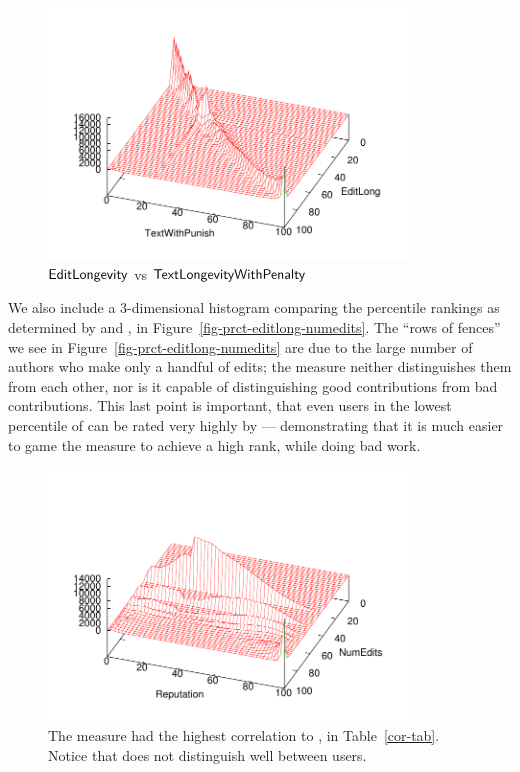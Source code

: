 \begin{figure}[t]
    \begin{center}
    \includegraphics[width=0.85\textwidth]{part-I10-contrib/graphs/prct-editlong-textwithpunish}
    \end{center}
    \caption[$\editlong$ vs $\punish$]{
    	$\editlong$ vs $\punish$
    }
    \label{fig-prct-editlong-textwithpunish}
\end{figure}
%

We also include a 3-dimensional histogram comparing the
percentile rankings as determined by \editlong and \numedits,
in Figure~\ref{fig-prct-editlong-numedits}.
The ``rows of fences'' we see
in Figure~\ref{fig-prct-editlong-numedits}
are due to the large number of authors who
make only a handful of edits; the \numedits measure
neither distinguishes them from each other,
nor is it capable of distinguishing good contributions from 
bad contributions.
This last point is important, that even users in
the lowest percentile of \editlong can be rated
very highly by \numedits --- demonstrating
that it is much easier to game the \numedits
measure to achieve a high rank, while doing bad work.
%
\begin{figure}[t]
    \begin{center}
    \includegraphics[width=0.85\textwidth]{part-I10-contrib/graphs/prct-numedits-reputation}
    \end{center}
    \caption[NumEdits vs Reputation]{
    	The  measure had the highest correlation to \numedits,
	in Table~\ref{cor-tab}.
	Notice that \numedits does not distinguish well
	between users.
    }
    \label{fig-prct-numedits-reputation}
\end{figure}

